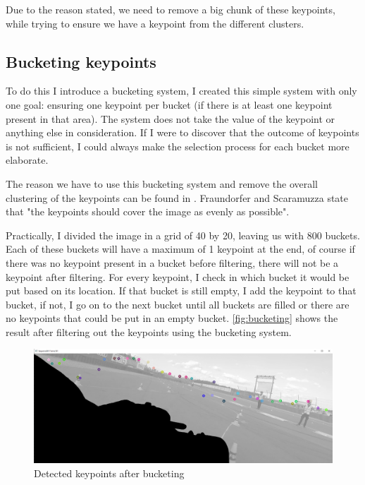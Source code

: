 Due to the reason stated, we need to remove a big chunk of these keypoints, while trying to ensure we have a keypoint from the different clusters. 

\subsection{Bucketing keypoints}\label{ssec:bucketing}
To do this I introduce a bucketing system, I created this simple system with only one goal: ensuring one keypoint per bucket (if there is at least one keypoint present in that area). The system does not take the value of the keypoint or anything else in consideration. If I were to discover that the outcome of keypoints is not sufficient, I could always make the selection process for each bucket more elaborate.\bigskip

The reason we have to use this bucketing system and remove the overall clustering of the keypoints can be found in \cite{6153423}. Fraundorfer and Scaramuzza state that "the keypoints should cover the image as evenly as possible".\bigskip 


Practically, I divided the image in a grid of 40 by 20, leaving us with 800 buckets. Each of these buckets will have a maximum of 1 keypoint at the end, of course if there was no keypoint present in a bucket before filtering, there will not be a keypoint after filtering. For every keypoint, I check in which bucket it would be put based on its location. If that bucket is still empty, I add the keypoint to that bucket, if not, I go on to the next bucket until all buckets are filled or there are no keypoints that could be put in an empty bucket. \autoref{fig:bucketing} shows the result after filtering out the keypoints using the bucketing system.\bigskip

\begin{figure}
    \centering
    \includegraphics[width=1\textwidth]{figures/bucketing_filtered.png}
    \caption{Detected keypoints after bucketing}
    \label{fig:bucketing}
\end{figure}

